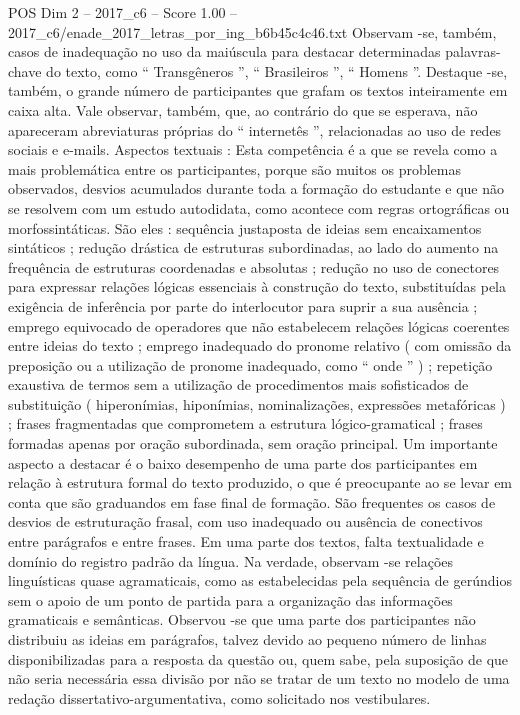 \begin{textsample}{POS Dim 2 – 2017\_c6 – Score 1.00 – 2017\_c6/enade\_2017\_letras\_por\_ing\_b6b45c4c46.txt}
Observam -se, também, casos de inadequação no uso da maiúscula para destacar determinadas palavras-chave do texto, como “ Transgêneros ”, “ Brasileiros ”, “ Homens ”.
Destaque -se, também, o grande número de participantes que grafam os textos inteiramente em caixa alta.
Vale observar, também, que, ao contrário do que se esperava, não apareceram abreviaturas próprias do “ internetês ”, relacionadas ao uso de redes sociais e e-mails.
Aspectos textuais : Esta competência é a que se revela como a mais problemática entre os participantes, porque são muitos os problemas observados, desvios acumulados durante toda a formação do estudante e que não se resolvem com um estudo autodidata, como acontece com regras ortográficas ou morfossintáticas.
São eles : sequência justaposta de ideias sem encaixamentos sintáticos ; redução drástica de estruturas subordinadas, ao lado do aumento na frequência de estruturas coordenadas e absolutas ; redução no uso de conectores para expressar relações lógicas essenciais à construção do texto, substituídas pela exigência de inferência por parte do interlocutor para suprir a sua ausência ; emprego equivocado de operadores que não estabelecem relações lógicas coerentes entre ideias do texto ; emprego inadequado do pronome relativo ( com omissão da preposição ou a utilização de pronome inadequado, como “ onde ” ) ; repetição exaustiva de termos sem a utilização de procedimentos mais sofisticados de substituição ( hiperonímias, hiponímias, nominalizações, expressões metafóricas ) ; frases fragmentadas que comprometem a estrutura lógico-gramatical ; frases formadas apenas por oração subordinada, sem oração principal.
Um importante aspecto a destacar é o baixo desempenho de uma parte dos participantes em relação à estrutura formal do texto produzido, o que é preocupante ao se levar em conta que são graduandos em fase final de formação.
São frequentes os casos de desvios de estruturação frasal, com uso inadequado ou ausência de conectivos entre parágrafos e entre frases.
Em uma parte dos textos, falta textualidade e domínio do registro padrão da língua.
Na verdade, observam -se relações linguísticas quase agramaticais, como as estabelecidas pela sequência de gerúndios sem o apoio de um ponto de partida para a organização das informações gramaticais e semânticas.
Observou -se que uma parte dos participantes não distribuiu as ideias em parágrafos, talvez devido ao pequeno número de linhas disponibilizadas para a resposta da questão ou, quem sabe, pela suposição de que não seria necessária essa divisão por não se tratar de um texto no modelo de uma redação dissertativo-argumentativa, como solicitado nos vestibulares.

\end{textsample}

